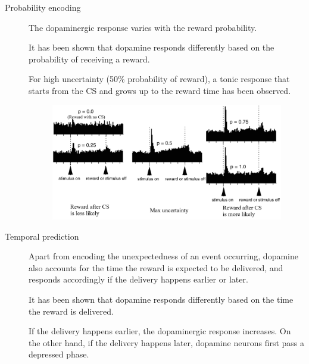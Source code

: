 \begin{description}
\begin{description}
            \item[Probability encoding] 
                The dopaminergic response varies with the reward probability.

                \begin{casestudy}
                    It has been shown that dopamine responds differently based on the probability of receiving a reward.
                    
                    For high uncertainty (50\% probability of reward), a tonic response that starts from the CS and grows up to the reward time has been observed.

                    \begin{figure}[H]
                        \centering
                        \includegraphics[width=0.8\linewidth]{../module1/img/dopamine_probability.png}
                    \end{figure}
                \end{casestudy}


            \item[Temporal prediction] 
                Apart from encoding the unexpectedness of an event occurring, dopamine also accounts for the time the reward is expected to be delivered,
                and responds accordingly if the delivery happens earlier or later.

                \begin{casestudy}
                    It has been shown that dopamine responds differently based on the time the reward is delivered.

                    If the delivery happens earlier, the dopaminergic response increases.
                    On the other hand, if the delivery happens later, dopamine neurons first pass a depressed phase.


\end{casestudy}
\end{description}
\end{description}
